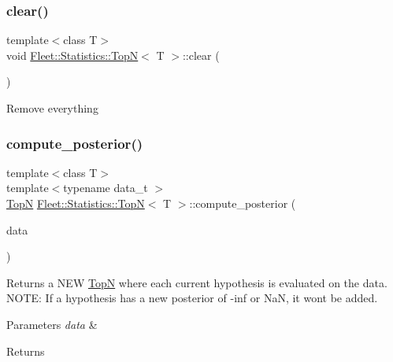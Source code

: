 \subsubsection{\texorpdfstring{clear()}{clear()}}
{\footnotesize\ttfamily template$<$class T$>$ \\
void \hyperlink{class_fleet_1_1_statistics_1_1_top_n}{Fleet\+::\+Statistics\+::\+TopN}$<$ T $>$\+::clear (\begin{DoxyParamCaption}{ }\end{DoxyParamCaption})\hspace{0.3cm}{\ttfamily [inline]}}

Remove everything\mbox{\label{class_fleet_1_1_statistics_1_1_top_n_a620e95f050930e7aa5d02e72365f8e88}} 
\subsubsection{\texorpdfstring{compute\+\_\+posterior()}{compute\_posterior()}}
{\footnotesize\ttfamily template$<$class T$>$ \\
template$<$typename data\+\_\+t $>$ \\
\hyperlink{class_fleet_1_1_statistics_1_1_top_n}{TopN} \hyperlink{class_fleet_1_1_statistics_1_1_top_n}{Fleet\+::\+Statistics\+::\+TopN}$<$ T $>$\+::compute\+\_\+posterior (\begin{DoxyParamCaption}\item[{data\+\_\+t \&}]{data }\end{DoxyParamCaption})\hspace{0.3cm}{\ttfamily [inline]}}

Returns a N\+EW \hyperlink{class_fleet_1_1_statistics_1_1_top_n}{TopN} where each current hypothesis is evaluated on the data. N\+O\+TE\+: If a hypothesis has a new posterior of -\/inf or NaN, it won\textquotesingle{}t be added. 
\begin{DoxyParams}{Parameters}
{\em data} & \\
\hline
\end{DoxyParams}
\begin{DoxyReturn}{Returns}

\end{DoxyReturn}
\mbox{\label{class_fleet_1_1_statistics_1_1_top_n_a0e09337a1f36d16a25b03d63f68952a0}} 

